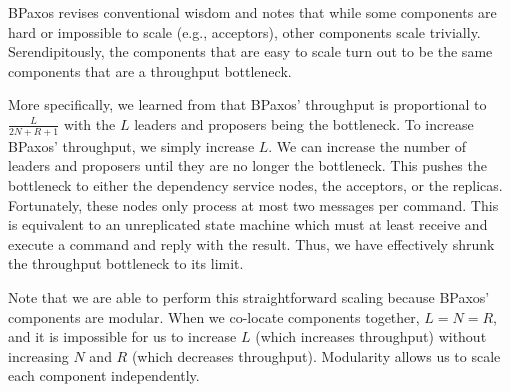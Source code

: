 BPaxos revises conventional wisdom and notes that while some components are
hard or impossible to scale (e.g., acceptors), other components scale
trivially. Serendipitously, the components that are easy to scale turn out to
be the same components that are a throughput bottleneck.

More specifically, we learned from  that BPaxos'
throughput is proportional to $\frac{L}{2N+R+1}$ with the $L$ leaders and
proposers being the bottleneck. To increase BPaxos' throughput, we simply
increase $L$. We can increase the number of leaders and proposers until they
are no longer the bottleneck. This pushes the bottleneck to either the
dependency service nodes, the acceptors, or the replicas. Fortunately, these
nodes only process at most two messages per command. This is equivalent to an
unreplicated state machine which must at least receive and execute a command
and reply with the result. Thus, we have effectively shrunk the throughput
bottleneck to its limit.

Note that we are able to perform this straightforward scaling because BPaxos'
components are modular. When we co-locate components together, $L=N=R$,
and it is impossible for us to increase $L$ (which increases throughput) without
increasing $N$ and $R$ (which decreases throughput). Modularity allows us
to scale each component independently.
